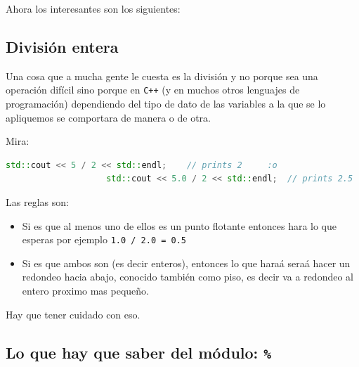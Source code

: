 \documentclass[12pt, fleqn]{report}                             %
\newcommand \Quote              {\qq}                           %
\theoremstyle{break}                                            %
\newcommand{\textCode}[1]  { \texttt{#1} }                      %
\newcommand{\Cpp}{\ignorespaces\textCode{C++}}                  %
\begin{document}
                Ahora los interesantes son los siguientes:

            \clearpage
            \subsection{División entera}

                Una cosa que a mucha gente le cuesta es la división y no porque
                sea una operación difícil sino porque en \Cpp (y en muchos otros lenguajes de programación)
                dependiendo del tipo de dato de las variables a la que se lo  apliquemos se comportara 
                de manera o de otra.

                Mira:
                \begin{lstlisting}[language=C++, gobble=20]
                    std::cout << 5 / 2 << std::endl;    // prints 2     :o
                    std::cout << 5.0 / 2 << std::endl;  // prints 2.5   :o
                \end{lstlisting}


                Las reglas son:
                \begin{itemize}
                    \item  
                        Si es que al menos uno de ellos es un punto flotante entonces hara lo que esperas
                        por ejemplo \textCode{1.0 / 2.0 = 0.5}
                    \item  
                        Si es que ambos son \Quote{integrals} (es decir enteros), entonces lo que haraá seraá hacer un
                        redondeo hacia abajo, conocido también como piso, es decir
                        va a redondeo al entero proximo mas pequeño.
                \end{itemize}

                Hay que tener cuidado con eso.

            \subsection{Lo que hay que saber del módulo: \textCode{\%}}
            
\end{document}
